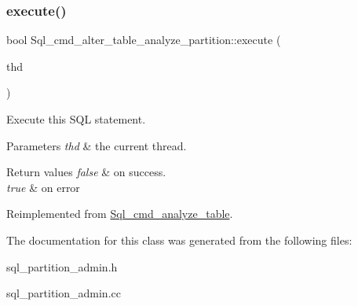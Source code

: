\subsubsection{\texorpdfstring{execute()}{execute()}}
{\footnotesize\ttfamily bool Sql\+\_\+cmd\+\_\+alter\+\_\+table\+\_\+analyze\+\_\+partition\+::execute (\begin{DoxyParamCaption}\item[{T\+HD $\ast$}]{thd }\end{DoxyParamCaption})\hspace{0.3cm}{\ttfamily [virtual]}}

Execute this S\+QL statement. 
\begin{DoxyParams}{Parameters}
{\em thd} & the current thread. \\
\hline
\end{DoxyParams}

\begin{DoxyRetVals}{Return values}
{\em false} & on success. \\
\hline
{\em true} & on error \\
\hline
\end{DoxyRetVals}


Reimplemented from \mbox{\hyperlink{classSql__cmd__analyze__table_ab6efba3102a2c21c273245fcd3de28e5}{Sql\+\_\+cmd\+\_\+analyze\+\_\+table}}.



The documentation for this class was generated from the following files\+:\begin{DoxyCompactItemize}
\item 
sql\+\_\+partition\+\_\+admin.\+h\item 
sql\+\_\+partition\+\_\+admin.\+cc\end{DoxyCompactItemize}
